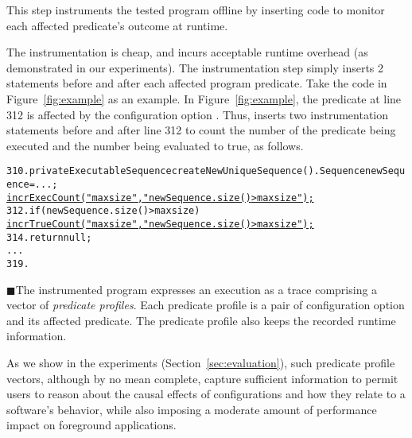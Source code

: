 This step instruments the tested program offline
by inserting code to monitor each affected predicate's outcome
at runtime.

The instrumentation is cheap, and incurs acceptable runtime
overhead (as demonstrated in our experiments). The instrumentation step
simply inserts 2 statements
before and after each affected program predicate. Take
the code in Figure~\ref{fig:example} as an example.
In Figure~\ref{fig:example}, the predicate at line 312 is affected by
the configuration option . Thus, \ourtool inserts
two instrumentation statements before and after line 312 to count the number of
the predicate being executed and the number being evaluated to true,
as follows.


\begin{CodeOut}
\begin{alltt}
310. private ExecutableSequence createNewUniqueSequence() .   Sequence newSequence = ...; 
       \underline{incrExecCount("maxsize", "newSequence.size() > maxsize");}
312.   if (newSequence.size() > maxsize) \ttlcb
         \underline{incrTrueCount("maxsize", "newSequence.size() > maxsize");}
314.     return null;
      ...
319. \ttrcb
\end{alltt}
\end{CodeOut}


$\blacksquare$The instrumented program expresses an execution
as a trace comprising a vector of \textit{predicate profiles}.
Each predicate profile is a pair of configuration
option and its affected predicate.
The predicate profile also keeps the recorded runtime information.

As we
show in the experiments (Section~\ref{sec:evaluation}), such predicate profile
vectors, although by no mean complete, capture
sufficient information to permit users
to reason about the causal effects of configurations
and how they relate to a software's behavior, while
also imposing a moderate amount of performance impact
on foreground applications.





